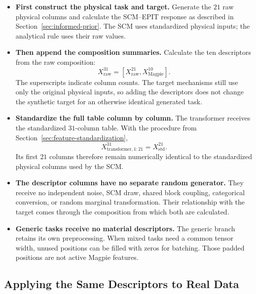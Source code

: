 \documentclass[11pt]{article}
\newenvironment{notes}
  {\begin{itemize}\setlength{\itemsep}{0.45em}\setlength{\parsep}{0pt}}
  {\end{itemize}}
\begin{document}
\begin{notes}
    \item \textbf{First construct the physical task and target.}
    Generate the \(21\) raw physical columns and calculate
    the SCM--EPIT response as described in
    Section~\ref{sec:informed-prior}.
    The SCM uses standardized physical inputs; the
    analytical rule uses their raw values.

    \item \textbf{Then append the composition summaries.}
    Calculate the ten descriptors from the raw composition:
    \[
        X_{\mathrm{raw}}^{31}
        =
        [X_{\mathrm{raw}}^{21},
         X_{\mathrm{Magpie}}^{10}].
    \]
    The superscripts indicate column counts.
    The target mechanisms still use only the original
    physical inputs, so adding the descriptors does not
    change the synthetic target for an otherwise identical
    generated task.

    \item \textbf{Standardize the full table column by column.}
    The transformer receives the standardized
    \(31\)-column table. With the procedure from
    Section~\ref{sec:feature-standardization},
    \[
        X_{\mathrm{transformer},1:21}^{31}
        =
        X_{\mathrm{std}}^{21}.
    \]
    Its first \(21\) columns therefore remain numerically
    identical to the standardized physical columns used
    by the SCM.

    \item \textbf{The descriptor columns have no separate random generator.}
    They receive no independent noise, SCM draw, shared
    block coupling, categorical conversion, or random
    marginal transformation.
    Their relationship with the target comes through the
    composition from which both are calculated.

    \item \textbf{Generic tasks receive no material descriptors.}
    The generic branch retains its own preprocessing.
    When mixed tasks need a common tensor width, unused
    positions can be filled with zeros for batching.
    Those padded positions are not active Magpie features.
\end{notes}

\subsection{Applying the Same Descriptors to Real Data}
\label{sec:magpie-real-data}
\end{document}
